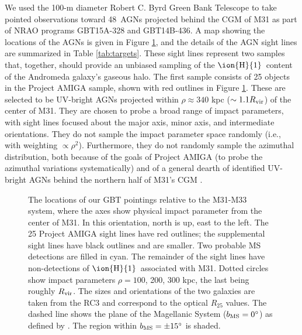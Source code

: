 \documentclass[12pt,preprint]{aastex6}
\newcommand{\qsonumber}{48}
\newcommand{\HI}{\ensuremath{\mbox{\ion{H}{1}}}}
\newcommand{\Rvir}{\ensuremath{R_{\rm vir}}\relax}
\begin{document}
We used the 100-m diameter Robert C. Byrd Green Bank Telescope
\citep{prestage2009} to take pointed observations toward \qsonumber\
AGNs projected behind the CGM of M31 as part of NRAO programs
GBT15A-328 and GBT14B-436. A map showing the locations of the AGNs is
given in Figure \ref{fig:map}, and the details of the AGN sight lines
are summarized in Table \ref{tab:targets}. These sight lines represent
two samples that, together, should provide an unbiased sampling of the
\HI\ content of the Andromeda galaxy's gaseous halo. The first sample
consists of 25 objects in the Project AMIGA sample, shown with red
outlines in Figure \ref{fig:map}. These are selected to be UV-bright
AGNs projected within $\rho \approx 340$ kpc ($\sim 1.1 \Rvir$) of the
center of M31. They are chosen to probe a broad range of impact
parameters, with sight lines focused about the major axis, minor axis,
and intermediate orientations. They do not sample the impact parameter
space randomly (i.e., with weighting $\propto \rho^2$). Furthermore,
they do not randomly sample the azimuthal distribution, both because
of the goals of Project AMIGA (to probe the azimuthal variations
systematically) and of a general dearth of identified UV-bright AGNs
behind the northern half of M31's CGM \citepalias[see][]{lehner2015}.

\begin{figure}
\caption{The locations of our GBT pointings relative to the M31-M33
  system, where the axes show physical impact parameter from the
  center of M31. In this orientation, north is up, east to the left.
  The 25 Project AMIGA sight lines have red outlines; the supplemental
  sight lines have black outlines and are smaller. Two probable MS
  detections are filled in cyan. The remainder of the sight lines have
  non-detections of \HI\ associated with M31. Dotted circles show
  impact parameters $\rho = 100$, 200, 300 kpc, the last being roughly
  \Rvir. The sizes and orientations of the two galaxies are taken from
  the RC3 \citep{de-vaucouleurs1991} and correspond to the optical
  $R_{25}$ values. The dashed line shows the plane of the Magellanic
  System ($b_{\rm MS} = 0^\circ$) as defined by
  \cite{nidever2008}. The region within $b_{\rm MS} = \pm15^\circ$ is
  shaded. \label{fig:map}}
%
\end{figure}
\end{document}

